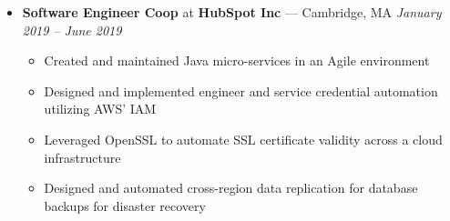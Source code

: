 \documentclass{article}
\begin{document}
\begin{itemize}[label={},leftmargin=*]
  \item \textbf{Software Engineer Coop} at \textbf{HubSpot Inc} --- Cambridge, MA \hfill {\em January 2019 -- June 2019}
  \begin{itemize}[label={$\bullet$}]
    \item Created and maintained Java micro-services in an Agile environment
    \item Designed and implemented engineer and service credential automation utilizing AWS' IAM
    \item Leveraged OpenSSL to automate SSL certificate validity across a cloud infrastructure
    \item Designed and automated cross-region data replication for database backups for disaster recovery

  \end{itemize}





\end{itemize}
\end{document}
